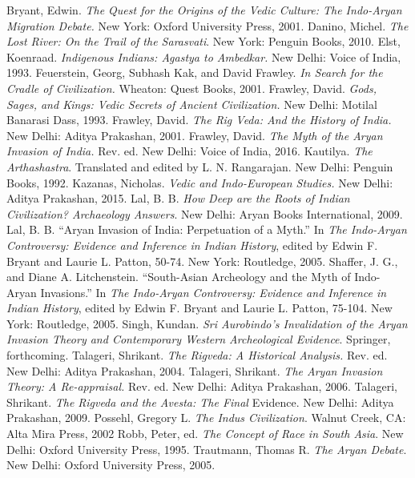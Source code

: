 \begin{thebibliography}{99}
 Bryant, Edwin. \textit{The Quest for the Origins of the Vedic Culture: The Indo-Aryan Migration Debate.} New York: Oxford University Press, 2001.
 Danino, Michel. \textit{The Lost River: On the Trail of the Sarasvati}. New York: Penguin Books, 2010.
 Elst, Koenraad. \textit{Indigenous Indians: Agastya to Ambedkar.} New Delhi: Voice of India, 1993.
 Feuerstein, Georg, Subhash Kak, and David Frawley. \textit{In Search for the Cradle of Civilization.} Wheaton: Quest Books, 2001.
 Frawley, David. \textit{Gods, Sages, and Kings: Vedic Secrets of Ancient Civilization.} New Delhi: Motilal Banarasi Dass, 1993.
 Frawley, David. \textit{The Rig Veda: And the History of India.} New Delhi: Aditya Prakashan, 2001. 
 Frawley, David. \textit{The Myth of the Aryan Invasion of India.} Rev. ed. New Delhi: Voice of India, 2016.
 Kautilya. \textit{The Arthashastra}. Translated and edited by L. N. Rangarajan. New Delhi: Penguin Books, 1992.
 Kazanas, Nicholas. \textit{Vedic and Indo-European Studies.} New Delhi: Aditya Prakashan, 2015.
 Lal, B. B. \textit{How Deep are the Roots of Indian Civilization? Archaeology Answers}. New Delhi: Aryan Books International, 2009.
 Lal, B. B. “Aryan Invasion of India: Perpetuation of a Myth.” In \textit{The Indo-Aryan Controversy: Evidence and Inference in Indian History}, edited by Edwin F. Bryant and Laurie L. Patton, 50-74. New York: Routledge, 2005.
 Shaffer, J. G., and Diane A. Litchenstein. “South-Asian Archeology and the Myth of Indo-Aryan Invasions.” In \textit{The Indo-Aryan Controversy: Evidence and Inference in Indian History}, edited by Edwin F. Bryant and Laurie L. Patton, 75-104. New York: Routledge, 2005.
 Singh, Kundan. \textit{Sri Aurobindo’s Invalidation of the Aryan Invasion Theory and Contemporary Western Archeological Evidence}. Springer, forthcoming. 
 Talageri, Shrikant. \textit{The Rigveda: A Historical Analysis.} Rev. ed. New Delhi: Aditya Prakashan, 2004. 
 Talageri, Shrikant. \textit{The Aryan Invasion Theory: A Re-appraisal.} Rev. ed. New Delhi: Aditya Prakashan, 2006.
 Talageri, Shrikant. \textit{The Rigveda and the Avesta: The Final} Evidence. New Delhi: Aditya Prakashan, 2009.
 Possehl, Gregory L. \textit{The Indus Civilization}. Walnut Creek, CA: Alta Mira Press, 2002
 Robb, Peter, ed. \textit{The Concept of Race in South Asia}. New Delhi: Oxford University Press, 1995. 
 Trautmann, Thomas R. \textit{The Aryan Debate}. New Delhi: Oxford University Press, 2005.
\end{thebibliography}

